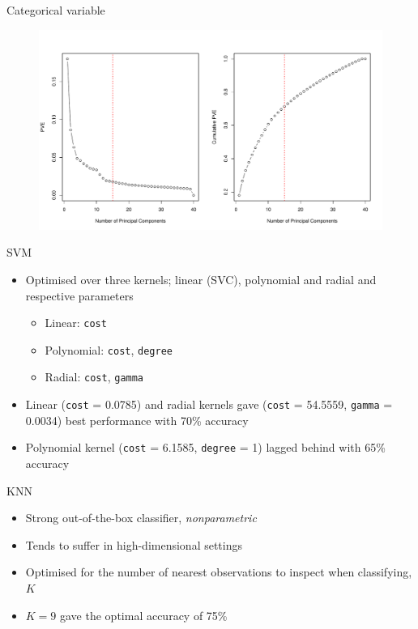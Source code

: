 \documentclass{beamer}
\let\OldTexttt\texttt
\renewcommand{\texttt}[1]{\OldTexttt{{\textcolor{islrred}{#1}}}}
\let\OldTextit\textit
\renewcommand{\textit}[1]{\OldTextit{{\textcolor{islrgreen}{#1}}}}
\begin{document}
\begin{frame}{Categorical variable}
  \begin{figure}
    \begin{center}
      \includegraphics[width=\textwidth]{pca_dube_categ.pdf}
    \end{center}
  \end{figure}
\end{frame}

\begin{frame}{SVM}
  \begin{itemize}
    \item Optimised over three kernels; linear (SVC), polynomial and radial
      and respective parameters
      \begin{itemize}
        \item Linear: \texttt{cost}
        \item Polynomial: \texttt{cost}, \texttt{degree}
        \item Radial: \texttt{cost}, \texttt{gamma}
      \end{itemize}
    \item Linear (\texttt{cost} = 0.0785) and radial kernels gave (\texttt{cost}
      = 54.5559, \texttt{gamma} = 0.0034) best performance with 70\% accuracy
    \item Polynomial kernel (\texttt{cost} = 6.1585, \texttt{degree} = 1) lagged
      behind with 65\% accuracy
  \end{itemize} 
\end{frame}

\begin{frame}{KNN}
  \begin{itemize}
    \item Strong out-of-the-box classifier, \textit{nonparametric}
    \item Tends to suffer in high-dimensional settings
    \item Optimised for the number of nearest observations to inspect when
      classifying, \(K\) 
    \item \(K = 9\) gave the optimal accuracy of 75\%  \end{itemize}
\end{frame}
\end{document}
